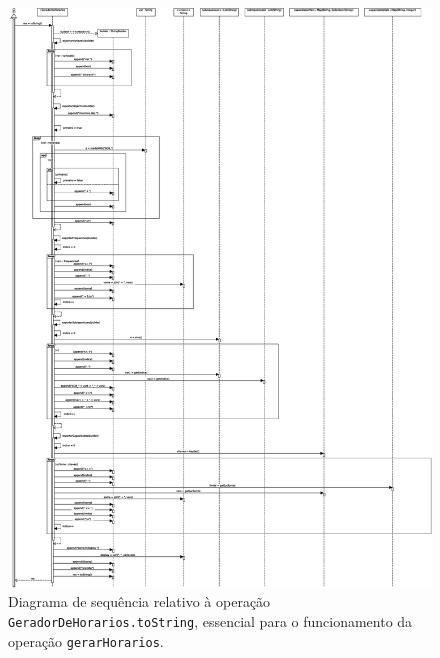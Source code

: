\documentclass[12pt, a4paper]{article}
\begin{document}
\begin{figure}[H]
    \centering
    \includegraphics[scale=0.32]{Imagens/Modelos/gerarHorariosToString.svg.eps}
    \caption{
        Diagrama de sequência relativo à operação \texttt{GeradorDeHorarios.toString},
        essencial para o funcionamento da operação \texttt{gerarHorarios}.
    }
\end{figure}
\end{document}
